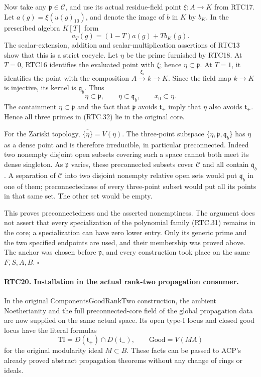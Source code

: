 \documentclass[11pt,a4paper]{article}
\numberwithin{equation}{section}
\theoremstyle{remark}\newtheorem{remark}[theorem]{Remark}
\begin{document}
Now take any \(\mathfrak p\in\mathcal C\), and use its
actual residue-field point \(\xi:A\to K\) from RTC17.
Let \(a(g)=\xi(u(g)_{10})\), and denote the image of \(b\)
in \(K\) by \(b_K\).  In the prescribed algebra \(K[T]\)
form
\[
 a_T(g)=(1-T)a(g)+Tb_K(g).
                                                        \tag{RTC.31}
\]
The scalar-extension, addition and scalar-multiplication assertions
of RTC13 show that this is a strict cocycle.  Let \(\eta\)
be the prime furnished by RTC18.  At \(T=0\), RTC16 identifies
the evaluated point with \(\xi\); hence
\(\eta\subset\mathfrak p\).  At \(T=1\), it identifies
the point with the composition \(A\xrightarrow{\xi_b}k\to K\).
Since the field map \(k\to K\) is injective, its kernel is
\(\mathfrak q_b\).  Thus
\[
 \eta\subset\mathfrak p,\qquad
 \eta\subset\mathfrak q_b,
 \qquad x_0\subset\eta.
                                                        \tag{RTC.32}
\]
The containment \(\eta\subset\mathfrak p\) and the fact
that \(\mathfrak p\) avoids \(\mathfrak t_+\) imply that
\(\eta\) also avoids \(\mathfrak t_+\).  Hence all three
primes in (RTC.32) lie in the original core.

For the Zariski topology,
\(\overline{\{\eta\}}=V(\eta)\).  The three-point subspace
\(\{\eta,\mathfrak p,\mathfrak q_b\}\) has \(\eta\) as
a dense point and is therefore irreducible, in particular
preconnected.  Indeed two nonempty disjoint open subsets covering
such a space cannot both meet its dense singleton.  As
\(\mathfrak p\) varies, these preconnected subsets cover
\(\mathcal C\) and all contain \(\mathfrak q_b\).
A separation of \(\mathcal C\) into two disjoint nonempty
relative open sets would put \(\mathfrak q_b\) in one of them;
preconnectedness of every three-point subset would put all its
points in that same set.  The other set would be empty.

This proves preconnectedness and the asserted nonemptiness.
The argument does not assert that every specialization of the
polynomial family (RTC.31) remains in the core; a specialization
can have zero lower entry.  Only its generic prime and the two
specified endpoints are used, and their membership was proved
above.  The anchor was chosen before \(\mathfrak p\), and
every construction took place on the same \(F,S,A,B\).
\hfill\(\square\)

\paragraph{RTC20. Installation in the actual rank-two propagation consumer.}
\label{claim:RTC20}
In the original \(\mathrm{ComponentsGoodRankTwo}\) construction,
the ambient Noetherianity and the full preconnected-core field of
the global propagation data are now supplied on the same actual
space.  Its open type-I locus and closed good locus have the
literal formulas
\[
 \mathrm{TI}
 =D(\mathfrak t_+)\cap D(\mathfrak t_-),\qquad
 \mathrm{Good}=V(MA)
                                                        \tag{RTC.33}
\]
for the original modularity ideal \(M\subset B\).
These facts can be passed to ACP's already proved abstract
propagation theorems without any change of rings or ideals.
\end{document}
